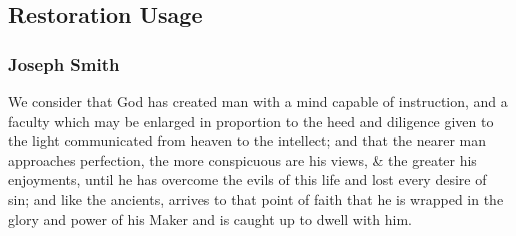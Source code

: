 \subsection{Restoration Usage} %
	\label{VIEW-RESTORATION}

	\subsubsection{Joseph Smith} %
		\label{VIEW-JS}
	
		\begin{compactdesc}
			\item[{\hyperref[EMS-1834-JS-CIR-FEB-1834]{Letter to the Church, circa February 1834}}] We consider that God has created man with a mind capable of instruction, and a faculty which may be enlarged in proportion to the heed and diligence given to the light communicated from heaven to the intellect; and that the nearer man approaches perfection, the more conspicuous are his views, \& the greater his enjoyments, until he has overcome the evils of this life and lost every desire of sin; and like the ancients, arrives to that point of faith that he is wrapped in the glory and power of his Maker and is caught up to dwell with him.
		\end{compactdesc}
	
	
	

	
		
